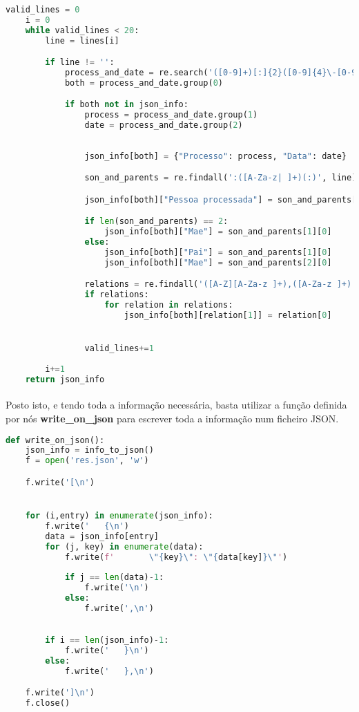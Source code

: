 \documentclass[11pt,a4paper]{report}
\begin{document}
\begin{enumerate}[label=\alph*.]
\begin{lstlisting}[language=Python]
    valid_lines = 0
    i = 0
    while valid_lines < 20:
        line = lines[i]

        if line != '':
            process_and_date = re.search('([0-9]+)[:]{2}([0-9]{4}\-[0-9]{2}\-[0-9]{2})', line)
            both = process_and_date.group(0)

            if both not in json_info:
                process = process_and_date.group(1)
                date = process_and_date.group(2)
            
            
                json_info[both] = {"Processo": process, "Data": date}

                son_and_parents = re.findall(':([A-Za-z| ]+)(:)', line)

                json_info[both]["Pessoa processada"] = son_and_parents[0][0]

                if len(son_and_parents) == 2:
                    json_info[both]["Mae"] = son_and_parents[1][0]
                else:
                    json_info[both]["Pai"] = son_and_parents[1][0]
                    json_info[both]["Mae"] = son_and_parents[2][0]

                relations = re.findall('([A-Z][A-Za-z ]+),([A-Za-z ]+). ?(?i:(Proc.[0-9]+))', line)
                if relations:
                    for relation in relations:
                        json_info[both][relation[1]] = relation[0]


                valid_lines+=1
    
        i+=1
    return json_info
        \end{lstlisting}

    \paragraph{}
    Posto isto, e tendo toda a informação necessária, basta utilizar a função definida por nós \textbf{write\_on\_json} para escrever toda a informação num ficheiro JSON.

    \begin{lstlisting}[language=Python]
def write_on_json():
    json_info = info_to_json()    
    f = open('res.json', 'w')

    f.write('[\n')


    for (i,entry) in enumerate(json_info):
        f.write('   {\n')
        data = json_info[entry]
        for (j, key) in enumerate(data):
            f.write(f'       \"{key}\": \"{data[key]}\"')
            
            if j == len(data)-1:
                f.write('\n')
            else:
                f.write(',\n')
            

        if i == len(json_info)-1:
            f.write('   }\n')
        else:
            f.write('   },\n')

    f.write(']\n')
    f.close()
    \end{lstlisting}
    
    \end{enumerate}
\end{document}
